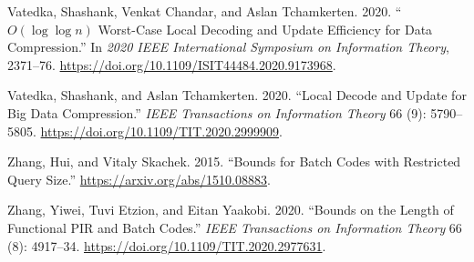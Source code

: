 \documentclass[
]{article}
\newlength{\cslhangindent}
\newlength{\cslentryspacingunit} %
\newenvironment{CSLReferences}[2] %
 {%
  \setlength{\parindent}{0pt}
  \ifodd #1
  \let\oldpar\par
  \def\par{\hangindent=\cslhangindent\oldpar}
  \fi
  \setlength{\parskip}{#2\cslentryspacingunit}
 }%
 {}
\begin{document}
\begin{CSLReferences}{1}{0}
\leavevmode{}%
Vatedka, Shashank, Venkat Chandar, and Aslan Tchamkerten. 2020.
{``\(O(\log\log n)\) Worst-Case Local Decoding and Update Efficiency for
Data Compression.''} In \emph{2020 IEEE International Symposium on
Information Theory}, 2371--76.
\url{https://doi.org/10.1109/ISIT44484.2020.9173968}.

\leavevmode{}%
Vatedka, Shashank, and Aslan Tchamkerten. 2020. {``Local Decode and
Update for Big Data Compression.''} \emph{IEEE Transactions on
Information Theory} 66 (9): 5790--5805.
\url{https://doi.org/10.1109/TIT.2020.2999909}.

\leavevmode{}%
Zhang, Hui, and Vitaly Skachek. 2015. {``Bounds for Batch Codes with
Restricted Query Size.''} \url{https://arxiv.org/abs/1510.08883}.

\leavevmode{}%
Zhang, Yiwei, Tuvi Etzion, and Eitan Yaakobi. 2020. {``Bounds on the
Length of Functional PIR and Batch Codes.''} \emph{IEEE Transactions on
Information Theory} 66 (8): 4917--34.
\url{https://doi.org/10.1109/TIT.2020.2977631}.

\end{CSLReferences}
\end{document}
